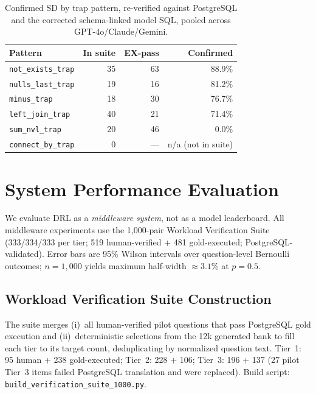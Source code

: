 \documentclass[twocolumn]{svjour3}
\begin{document}
\begin{table}[t]
\centering
\caption{Confirmed SD by trap pattern, re-verified against PostgreSQL and the corrected schema-linked model SQL, pooled across GPT-4o/Claude/Gemini.}
\label{tab:trap-pattern}
\small
\begin{tabular}{@{}lrrr@{}}
\toprule
\textbf{Pattern} & \textbf{In suite} & \textbf{EX-pass} & \textbf{Confirmed} \\
\midrule
\texttt{not\_exists\_trap} & 35 & 63 & 88.9\% \\
\texttt{nulls\_last\_trap} & 19 & 16 & 81.2\% \\
\texttt{minus\_trap} & 18 & 30 & 76.7\% \\
\texttt{left\_join\_trap} & 40 & 21 & 71.4\% \\
\texttt{sum\_nvl\_trap} & 20 & 46 & 0.0\% \\
\texttt{connect\_by\_trap} & 0 & --- & n/a (not in suite) \\
\bottomrule
\end{tabular}
\end{table}

\section{System Performance Evaluation}
\label{sec:eval}

We evaluate DRL as a \emph{middleware system}, not as a model leaderboard.
All middleware experiments use the 1{,}000-pair Workload Verification Suite (333/334/333 per tier; 519 human-verified + 481 gold-executed; PostgreSQL-validated).
Error bars are 95\% Wilson intervals over question-level Bernoulli outcomes; $n{=}1{,}000$ yields maximum half-width $\approx 3.1\%$ at $p{=}0.5$.

\subsection{Workload Verification Suite Construction}

The suite merges (i)~all human-verified pilot questions that pass PostgreSQL gold execution and (ii)~deterministic selections from the 12k generated bank to fill each tier to its target count, deduplicating by normalized question text.
Tier~1: 95 human + 238 gold-executed; Tier~2: 228 + 106; Tier~3: 196 + 137 (27 pilot Tier~3 items failed PostgreSQL translation and were replaced).
Build script: \texttt{build\_verification\_suite\_1000.py}.
\end{document}
